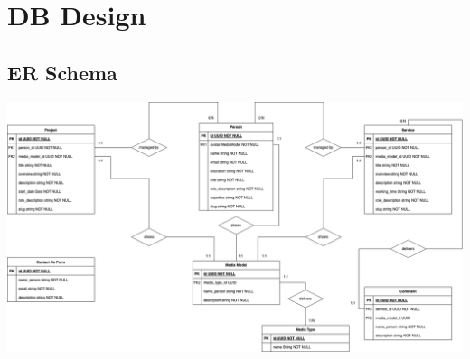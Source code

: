 \pagebreak
\section{DB Design}
\subsection{ER Schema}
\includegraphics[width=1\linewidth]{img/design-document/ER-diagram.png}


